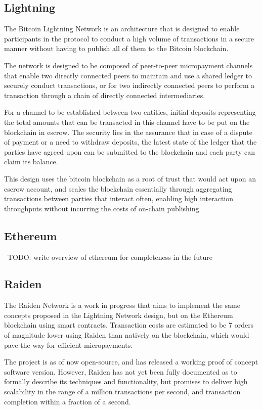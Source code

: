 \documentclass[12pt]{article}
\newcommand{\todo}[1]{{\color{red}\ TODO: {#1}}}
\begin{document}
\subsection{Lightning}
The Bitcoin Lightning Network\cite{lightning} is an architecture that is designed to enable participants in the protocol to conduct a high volume of transactions in a secure manner without having to publish all of them to the Bitcoin blockchain.

The network is designed to be composed of peer-to-peer micropayment channels that enable two directly connected peers to maintain and use a shared ledger to securely conduct transactions, or for two indirectly connected peers to perform a transaction through a chain of directly connected intermediaries.

For a channel to be established between two entities, initial deposits representing the total amounts that can be transacted in this channel have to be put on the blockchain in escrow. The security lies in the assurance that in case of a dispute of payment or a need to withdraw deposits, the latest state of the ledger that the parties have agreed upon can be submitted to the blockchain and each party can claim its balance.

This design uses the bitcoin blockchain as a root of trust that would act upon an escrow account, and scales the blockchain essentially through aggregating transactions between parties that interact often, enabling high interaction throughputs without incurring the costs of on-chain publishing.

\subsection{Ethereum}
\todo{write overview of ethereum for completeness in the future} \cite{ethereum}

\subsection{Raiden}
The Raiden Network\cite{raiden} is a work in progress that aims to implement the same concepts proposed in the Lightning Network design, but on the Ethereum blockchain using smart contracts. Transaction costs are estimated to be 7 orders of magnitude lower using Raiden than natively on the blockchain, which would pave the way for efficient micropayments.

The project is as of now open-source, and has released a working proof of concept software version. However, Raiden has not yet been fully documented as to formally describe its techniques and functionality, but promises to deliver high scalability in the range of a million transactions per second, and transaction completion within a fraction of a second.
\end{document}
